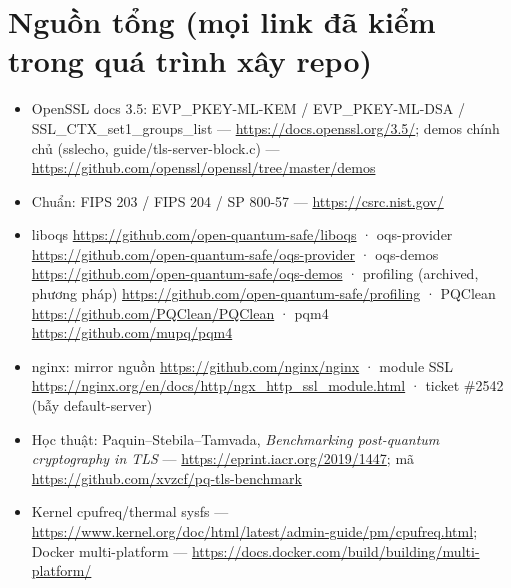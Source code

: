 \documentclass[11pt,a4paper]{article}
\begin{document}
\section*{Nguồn tổng (mọi link đã kiểm trong quá trình xây repo)}
\begin{itemize}
\item OpenSSL docs 3.5: EVP\_PKEY-ML-KEM / EVP\_PKEY-ML-DSA / SSL\_CTX\_set1\_groups\_list — \url{https://docs.openssl.org/3.5/}; demos chính chủ (sslecho, guide/tls-server-block.c) — \url{https://github.com/openssl/openssl/tree/master/demos}
\item Chuẩn: FIPS 203 / FIPS 204 / SP 800-57 — \url{https://csrc.nist.gov/}
\item liboqs \url{https://github.com/open-quantum-safe/liboqs} · oqs-provider \url{https://github.com/open-quantum-safe/oqs-provider} · oqs-demos \url{https://github.com/open-quantum-safe/oqs-demos} · profiling (archived, phương pháp) \url{https://github.com/open-quantum-safe/profiling} · PQClean \url{https://github.com/PQClean/PQClean} · pqm4 \url{https://github.com/mupq/pqm4}
\item nginx: mirror nguồn \url{https://github.com/nginx/nginx} · module SSL \url{https://nginx.org/en/docs/http/ngx_http_ssl_module.html} · ticket \#2542 (bẫy default-server)
\item Học thuật: Paquin–Stebila–Tamvada, \emph{Benchmarking post-quantum cryptography in TLS} — \url{https://eprint.iacr.org/2019/1447}; mã \url{https://github.com/xvzcf/pq-tls-benchmark}
\item Kernel cpufreq/thermal sysfs — \url{https://www.kernel.org/doc/html/latest/admin-guide/pm/cpufreq.html}; Docker multi-platform — \url{https://docs.docker.com/build/building/multi-platform/}
\end{itemize}
\end{document}
